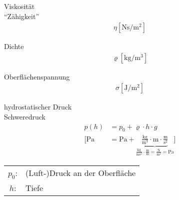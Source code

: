 %


\begin{karte}{Viskosität\\ ``Zähigkeit''}
    \begin{align*}
        \eta \left[ \si{\newton\second\per\square\meter} \right]
    \end{align*}
\end{karte}

\begin{karte}{Dichte}
    \begin{align*}
        \varrho \left[ \si{\kilogram\per\cubic\meter} \right]
    \end{align*}
\end{karte}

\begin{karte}{Oberflächenspannung}
    \begin{align*}
        \sigma \left[ \si{\joule\per\square\meter} \right]
    \end{align*}
\end{karte}

\begin{karte}{hydrostatischer Druck \\ Schweredruck}
    \begin{align*}
        p(h) &= p_0 + \varrho \cdot h \cdot g \\
        \bigg[ \si{\pascal} &= \si{\pascal} + \underbrace
            {\frac{\si{\kilogram}}{\si{\cubic\meter}} \cdot \si{\meter} \cdot \frac{\si{\meter}}{\si{\square\second}}}
            _{ \frac{\si{\kilogram}}{\si{\meter\square\second}} \cdot \frac{\si{\meter}}{\si{\meter}}=
            \frac{\si{\newton}}{\si{\square\meter}} = \si{\pascal}}
            \bigg]
    \end{align*}
    \begin{tabular}[t]{cl}
        \(p_0\): & (Luft-)Druck an der Oberfläche \\
        \(h\): & Tiefe
    \end{tabular}
\end{karte}


